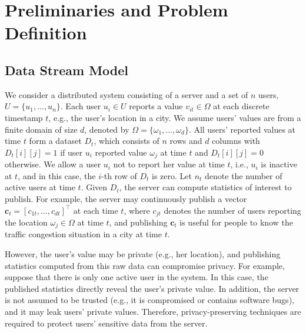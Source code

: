 \documentclass[acmsmall]{acmart}
\newcommand{\bc}{\mathbf{c}}
\begin{document}



\section{Preliminaries and Problem Definition}
\label{sec:Preliminaries}


\subsection{Data Stream Model}
\label{ss:data_stream}

We consider a distributed system consisting of a server and a set of $n$ users, $U=\{u_1,\ldots,u_n\}$.
Each user $u_i\in U$ reports a value $v_{it}\in\Omega$ at each discrete timestamp
$t$, e.g., the user's location in a city.
We assume users' values are from a finite domain of size $d$, denoted by
$\Omega=\{\omega_1,\ldots, \omega_d\}$.
All users' reported values at time $t$ form a dataset $D_t$, which consists of
$n$ rows and $d$ columns with $D_t[i][j]=1$ if user $u_i$ reported value
$\omega_j$ at time $t$ and $D_t[i][j]=0$ otherwise.
We allow a user $u_i$ not to report her value at time $t$, i.e., $u_i$ is
inactive at $t$, and in this case, the $i$-th row of $D_t$ is zero.
Let $n_t$ denote the number of active users at time $t$.
Given $D_t$, the server can compute statistics of interest to publish.
For example, the server may continuously publish a vector
$\bc_t=[c_{1t},\ldots,c_{dt}]^\top$ at each time $t$, where $c_{jt}$ denotes the
number of users reporting the location $\omega_j\in\Omega$ at time $t$, and
publishing $\bc_t$ is useful for people to know the traffic congestion situation
in a city at time $t$.

However, the user's value may be private (e.g., her location), and publishing
statistics computed from this raw data can compromise privacy.
For example, suppose that there is only one active user in the system. In this case, the
published statistics directly reveal the user's private value.
In addition, the server is not assumed to be trusted (e.g., it is compromised
or contains software bugs), and it may leak users' private values.
Therefore, privacy-preserving techniques are required to protect users'
sensitive data from the server.

\end{document}
